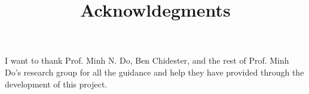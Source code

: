 \title{Acknowldegments}

I want to thank Prof. Minh N. Do, Ben Chidester, and the rest of 
Prof. Minh Do's research group for all the guidance and help they 
have provided through the development of this project.